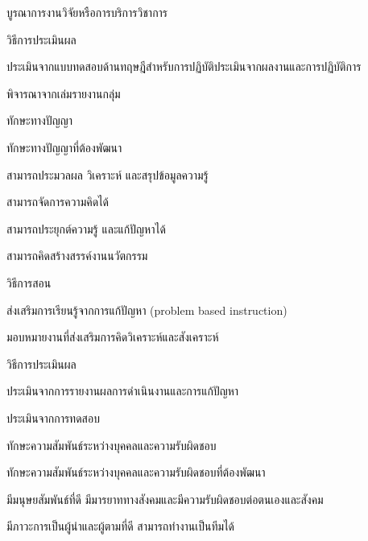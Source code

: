 \begin{edudev}
\begin{enumdev}
\begin{subenumdev}
				\item บูรณาการงานวิจัยหรือการบริการวิชาการ
				\end{subenumdev}
		\item วิธีการประเมินผล	
				\begin{subenumdev}
				\item ประเมินจากแบบทดสอบด้านทฤษฎีสำหรับการปฏิบัติประเมินจากผลงานและการปฏิบัติการ
				\item พิจารณาจากเล่มรายงานกลุ่ม
				\end{subenumdev}
		\end{enumdev}
\item ทักษะทางปัญญา
		\begin{enumdev}
			\item ทักษะทางปัญญาที่ต้องพัฒนา
					\begin{subenumdev}
						\item \withbc สามารถประมวลผล วิเคราะห์ และสรุปข้อมูลความรู้
						\item \withwc สามารถจัดการความคิดได้
						\item \withbc สามารถประยุกต์ความรู้ และแก้ปัญหาได้
						\item สามารถคิดสร้างสรรค์งานนวัตกรรม	
					\end{subenumdev}
			\item วิธีการสอน
					\begin{subenumdev}
						\item ส่งเสริมการเรียนรู้จากการแก้ปัญหา (problem based instruction)
						\item มอบหมายงานที่ส่งเสริมการคิดวิเคราะห์และสังเคราะห์
					\end{subenumdev}
			\item วิธีการประเมินผล
					\begin{subenumdev}
						\item ประเมินจากการรายงานผลการดำเนินงานและการแก้ปัญหา
						\item ประเมินจากการทดสอบ
					\end{subenumdev}
		\end{enumdev}
\item ทักษะความสัมพันธ์ระหว่างบุคคลและความรับผิดชอบ
		\begin{enumdev}
			\item ทักษะความสัมพันธ์ระหว่างบุคคลและความรับผิดชอบที่ต้องพัฒนา
					\begin{subenumdev}
						\item \withbc มีมนุษยสัมพันธ์ที่ดี มีมารยาททางสังคมและมีความรับผิดชอบต่อตนเองและสังคม
						\item \withbc มีภาวะการเป็นผู้นำและผู้ตามที่ดี สามารถทำงานเป็นทีมได้

\end{subenumdev}
\end{enumdev}
\end{edudev}

